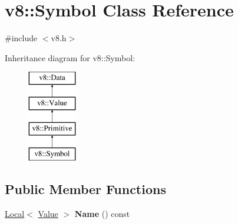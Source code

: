 \hypertarget{classv8_1_1_symbol}{}\section{v8\+:\+:Symbol Class Reference}
\label{classv8_1_1_symbol}


{\ttfamily \#include $<$v8.\+h$>$}

Inheritance diagram for v8\+:\+:Symbol\+:\begin{figure}[H]
\begin{center}
\leavevmode
\includegraphics[height=4.000000cm]{classv8_1_1_symbol}
\end{center}
\end{figure}
\subsection*{Public Member Functions}
\begin{DoxyCompactItemize}
\item 
\hypertarget{classv8_1_1_symbol_af1c1ccf079ac99e0db858c30e6458587}{}\hyperlink{classv8_1_1_local}{Local}$<$ \hyperlink{classv8_1_1_value}{Value} $>$ {\bfseries Name} () const \label{classv8_1_1_symbol_af1c1ccf079ac99e0db858c30e6458587}

\end{DoxyCompactItemize}
